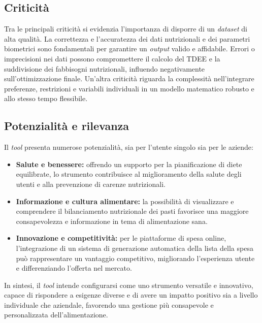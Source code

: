 \documentclass[11pt,a4paper]{article}
\begin{document}
\subsection{Criticità}  
Tra le principali criticità si evidenzia l’importanza di disporre di un \textit{dataset} di alta qualità. La correttezza e l’accuratezza dei dati nutrizionali e dei parametri biometrici sono fondamentali per garantire un \textit{output} valido e affidabile. Errori o imprecisioni nei dati possono compromettere il calcolo del TDEE e la suddivisione dei fabbisogni nutrizionali, influendo negativamente sull’ottimizzazione finale. Un’altra criticità riguarda la complessità nell’integrare preferenze, restrizioni e variabili individuali in un modello matematico robusto e allo stesso tempo flessibile.

\subsection{Potenzialità e rilevanza}  
Il \textit{tool} presenta numerose potenzialità, sia per l’utente singolo sia per le aziende:
\begin{itemize}
  \item \textbf{Salute e benessere:} offrendo un supporto per la pianificazione di diete equilibrate, lo strumento contribuisce al miglioramento della salute degli utenti e alla prevenzione di carenze nutrizionali.
  \item \textbf{Informazione e cultura alimentare:} la possibilità di visualizzare e comprendere il bilanciamento nutrizionale dei pasti favorisce una maggiore consapevolezza e informazione in tema di alimentazione sana.
  \item \textbf{Innovazione e competitività:} per le piattaforme di spesa online, l’integrazione di un sistema di generazione automatica della lista della spesa può rappresentare un vantaggio competitivo, migliorando l’esperienza utente e differenziando l’offerta nel mercato.
\end{itemize}
In sintesi, il \textit{tool} intende configurarsi come uno strumento versatile e innovativo, capace di rispondere a esigenze diverse e di avere un impatto positivo sia a livello individuale che aziendale, favorendo una gestione più consapevole e personalizzata dell’alimentazione.



\end{document}
